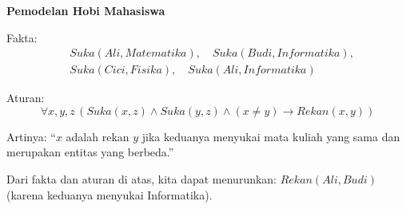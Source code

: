 \begin{contoh}
\textbf{Pemodelan Hobi Mahasiswa}

Fakta:
\begin{align*}
&Suka(Ali, Matematika), \quad Suka(Budi, Informatika), \\
&Suka(Cici, Fisika), \quad Suka(Ali, Informatika)
\end{align*}

Aturan:
\[ \forall x, y, z\, (Suka(x, z) \wedge Suka(y, z) \wedge (x \neq y) \rightarrow Rekan(x, y)) \]

Artinya: ``$x$ adalah rekan $y$ jika keduanya menyukai mata kuliah yang sama dan merupakan entitas yang berbeda.''

Dari fakta dan aturan di atas, kita dapat menurunkan: $Rekan(Ali, Budi)$ (karena keduanya menyukai Informatika).
\end{contoh}
